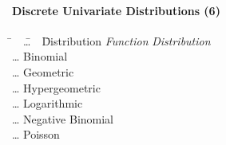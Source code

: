 \paragraph{Discrete Univariate Distributions (6)}

\begin{tabbing}
	\hspace*{1em}
	\= ~~\=\ldots~~\=  Distribution \kill
	\> \emph{Function} \> \> \emph{Distribution} \\[1ex]
	\> 	\> \ldots \> Binomial \\
	\> 	\> \ldots \> Geometric \\
	\> 	\> \ldots \> Hypergeometric \\
	\> 	\> \ldots \> Logarithmic \\
	\> 	\> \ldots \> Negative Binomial \\
	\> 	\> \ldots \> Poisson \\
\end{tabbing}

